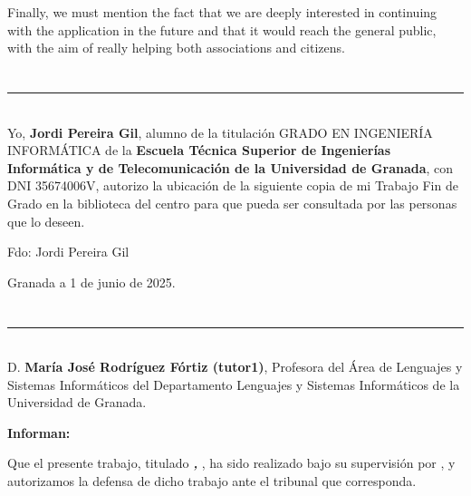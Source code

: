 Finally, we must mention the fact that we are deeply interested in continuing with the application in the future and that it would reach the general public, with the aim of really helping both associations and citizens.

\chapter*{}
\thispagestyle{empty}

\noindent\rule[-1ex]{\textwidth}{2pt}\\[4.5ex]

Yo, \textbf{Jordi Pereira Gil}, alumno de la titulación GRADO EN INGENIERÍA INFORMÁTICA de la \textbf{Escuela Técnica Superior
de Ingenierías Informática y de Telecomunicación de la Universidad de Granada}, con DNI 35674006V, autorizo la
ubicación de la siguiente copia de mi Trabajo Fin de Grado en la biblioteca del centro para que pueda ser
consultada por las personas que lo deseen.

\vspace{6cm}

\noindent Fdo: Jordi Pereira Gil

\vspace{2cm}

\begin{flushright}
Granada a 1 de junio de 2025.
\end{flushright}


\chapter*{}
\thispagestyle{empty}

\noindent\rule[-1ex]{\textwidth}{2pt}\\[4.5ex]

D. \textbf{	María José Rodríguez Fórtiz (tutor1)}, Profesora del Área de Lenguajes y Sistemas Informáticos del Departamento Lenguajes y Sistemas Informáticos de la Universidad de Granada.

\vspace{0.5cm}


\vspace{0.5cm}

\textbf{Informan:}

\vspace{0.5cm}

Que el presente trabajo, titulado \textit{\textbf{\myTitle, \mySubTitle}},
ha sido realizado bajo su supervisión por \textbf{\myName}, y autorizamos la defensa de dicho trabajo ante el tribunal
que corresponda.


